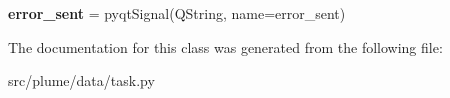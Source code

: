 \begin{DoxyCompactItemize}
\item 
{\bfseries error\+\_\+sent} = pyqt\+Signal(\textquotesingle{}Q\+String\textquotesingle{}, name=\textquotesingle{}error\+\_\+sent\textquotesingle{})\hypertarget{classplume-creator_1_1src_1_1plume_1_1data_1_1task_1_1_task_a95d9dd1906db890f94e0b0226fbe342d}{}\label{classplume-creator_1_1src_1_1plume_1_1data_1_1task_1_1_task_a95d9dd1906db890f94e0b0226fbe342d}

\end{DoxyCompactItemize}


The documentation for this class was generated from the following file\+:\begin{DoxyCompactItemize}
\item 
src/plume/data/task.\+py\end{DoxyCompactItemize}

